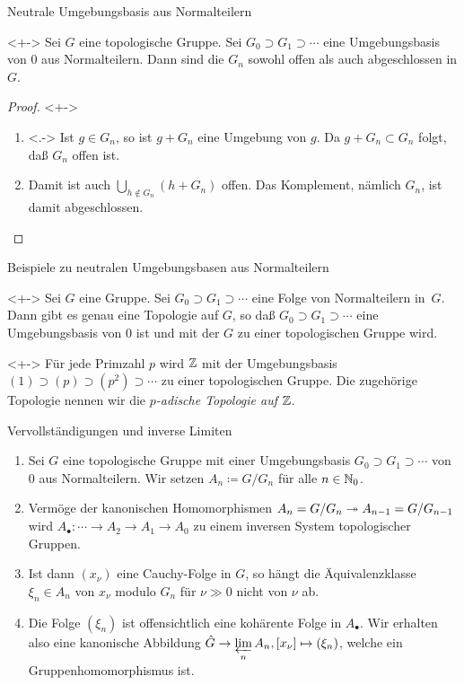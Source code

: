 \begin{frame}{Neutrale Umgebungsbasis aus Normalteilern}
	\begin{proposition}<+->
		Sei \(G\) eine topologische Gruppe. Sei \(G_0 \supset G_1 \supset \dotsb\)
		eine Umgebungsbasis von \(0\) aus Normalteilern. Dann sind die \(G_n\) sowohl offen als auch
		abgeschlossen in \(G\).
	\end{proposition}
	\begin{proof}<+->
		\begin{enumerate}[<+->]
		\item<.->
			Ist \(g \in G_n\), so ist \(g + G_n\) eine Umgebung von \(g\). Da \(g + G_n \subset G_n\)
			folgt, daß \(G_n\) offen ist.
		\item
			Damit ist auch \(\bigcup\limits_{h \notin G_n} (h + G_n)\) offen. Das Komplement, nämlich 
			\(G_n\), ist damit abgeschlossen.
			\qedhere
		\end{enumerate}
	\end{proof}
\end{frame}

\begin{frame}{Beispiele zu neutralen Umgebungsbasen aus Normalteilern}
	\begin{example}<+->
		Sei \(G\) eine  Gruppe. Sei \(G_0 \supset G_1 \supset \dotsb\) eine
		Folge von Normalteilern in~\(G\). Dann gibt es genau eine Topologie
		auf \(G\), so daß \(G_0 \supset G_1 \supset \dotsb\) eine Umgebungsbasis
		von \(0\) ist und mit der \(G\) zu einer topologischen Gruppe wird.
	\end{example}
	\begin{example}<+->
		Für jede Primzahl \(p\) wird
		\(\mathbb Z\) mit der Umgebungsbasis \((1) \supset (p) \supset (p^2) \supset \dotsb\)
		zu einer topologischen Gruppe. Die zugehörige Topologie nennen wir
		die \emph{\(p\)-adische Topologie auf \(\mathbb Z\)}.
	\end{example}
\end{frame}

\begin{frame}{Vervollständigungen und inverse Limiten}
	\begin{enumerate}[<+->]
	\item
		Sei \(G\) eine topologische Gruppe mit einer Umgebungsbasis \(G_0 \supset G_1 \supset \dotsb\)
		von \(0\) aus Normalteilern. Wir setzen \(A_n \coloneqq G/G_n\) für alle \(n \in \mathbb N_0\).
	\item
		Vermöge der kanonischen Homomorphismen \(A_n = G/G_n \twoheadrightarrow A_{n - 1} = G/G_{n - 1}\) wird
		\(A_\bullet\colon \dotsb \to A_2 \to A_1 \to A_0\) zu einem inversen System topologischer Gruppen.
	\item
		Ist dann \((x_{\nu})\) eine Cauchy-Folge in \(G\), so hängt die Äquivalenzklasse \(\xi_n \in A_n\) von
		\(x_{\nu}\) modulo \(G_n\) für \(\nu \gg 0\) nicht von \(\nu\) ab.
	\item
		Die Folge \((\xi_n)\) ist offensichtlich eine kohärente Folge in \(A_\bullet\). Wir erhalten also
		eine kanonische Abbildung \(\hat G \to \varprojlim\limits_n A_n, [x_\nu] \mapsto (\xi_n)\),
		welche ein Gruppenhomomorphismus ist.
	\end{enumerate}
\end{frame}

